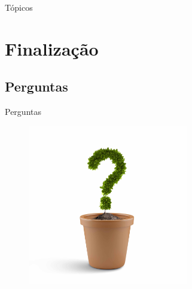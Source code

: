 

\begin{frame}{Tópicos}
	\tableofcontents[sections={1-10}] 
\end{frame}
 









\section{Finalização}
\subsection{Perguntas}
\begin{frame}{Perguntas}
	\begin{figure}
		\centering
		\includegraphics[width=7cm,keepaspectratio=true]{img/ask.jpg}
	\end{figure}
\end{frame}

